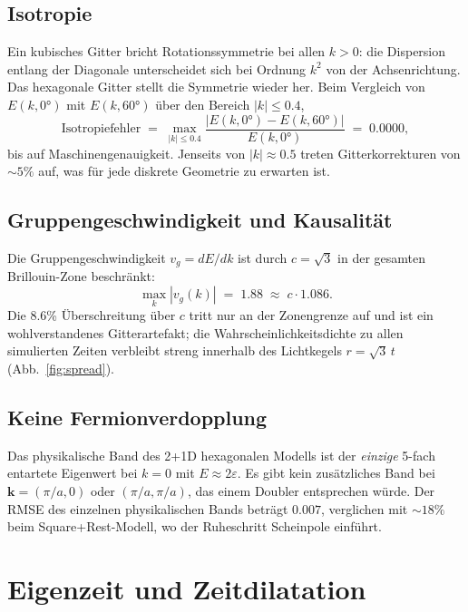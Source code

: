 \documentclass[twocolumn,showpacs,preprintnumbers,amsmath,amssymb]{revtex4-2}
\newcommand{\eps}{\varepsilon}
\begin{document}
\subsection{Isotropie}

Ein kubisches Gitter bricht Rotationssymmetrie bei allen $k > 0$: die
Dispersion entlang der Diagonale unterscheidet sich bei Ordnung $k^2$ von
der Achsenrichtung.
Das hexagonale Gitter stellt die Symmetrie wieder her.
Beim Vergleich von $E(k, 0°)$ mit $E(k, 60°)$ über den Bereich $|k| \le 0.4$,
\begin{equation}
  \mathrm{Isotropiefehler} \;=\;
  \max_{|k| \le 0.4}
  \frac{|E(k,0°) - E(k,60°)|}{E(k,0°)}
  \;=\; 0.0000,
  \label{eq:isotropy}
\end{equation}
bis auf Maschinengenauigkeit.
Jenseits von $|k| \approx 0.5$ treten Gitterkorrekturen von $\sim 5\%$ auf,
was für jede diskrete Geometrie zu erwarten ist.

\subsection{Gruppengeschwindigkeit und Kausalität}

Die Gruppengeschwindigkeit $v_g = dE/dk$ ist durch $c = \sqrt{3}$ in der
gesamten Brillouin-Zone beschränkt:
\begin{equation}
  \max_{k} |v_g(k)| \;=\; 1.88 \;\approx\; c \cdot 1.086.
  \label{eq:vg_max}
\end{equation}
Die 8.6\% Überschreitung über $c$ tritt nur an der Zonengrenze auf und ist
ein wohlverstandenes Gitterartefakt; die Wahrscheinlichkeitsdichte zu allen
simulierten Zeiten verbleibt streng innerhalb des Lichtkegels $r = \sqrt{3}\,t$
(Abb.~\ref{fig:spread}).

\subsection{Keine Fermionverdopplung}

Das physikalische Band des 2+1D hexagonalen Modells ist der \emph{einzige}
5-fach entartete Eigenwert bei $k=0$ mit $E \approx 2\eps$.
Es gibt kein zusätzliches Band bei $\mathbf{k} = (\pi/a, 0)$ oder
$(\pi/a, \pi/a)$, das einem Doubler entsprechen würde.
Der RMSE des einzelnen physikalischen Bands beträgt $0.007$, verglichen mit
$\sim 18\%$ beim Square+Rest-Modell, wo der Ruheschritt Scheinpole einführt.

\section{Eigenzeit und Zeitdilatation}
\label{sec:propertime}
\end{document}
